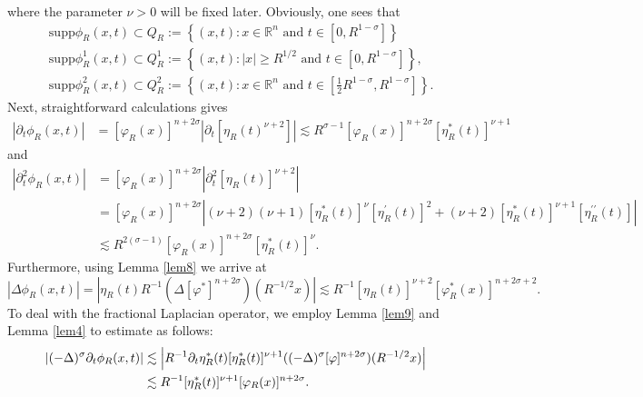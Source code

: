 \documentclass[11pt,reqno]{amsart}
\numberwithin{equation}{section}
\theoremstyle{plain}
\begin{document}
where the parameter $\nu>0$ will be fixed later. Obviously, one sees that
\[
\begin{aligned}
&\text{supp}\phi_R(x,t)\subset Q_R:=\left\{(x,t):x\in \mathbb{R}^n \text{ and } t\in[0,R^{1-\sigma}]\right\} \\
&\text{supp}\phi^1_R(x,t)\subset Q^1_R:=\left\{(x,t):|x|\geq R^{1/2} \text{ and }t\in [0,R^{1-\sigma}]\right\},\\
&\text{supp}\phi^2_R(x,t)\subset Q^2_{R}:=\left\{(x,t):x\in \mathbb{R}^n \text{ and }t\in \left[\frac{1}{2}R^{1-\sigma}, R^{1-\sigma}\right]\right\}.
\end{aligned}
\]
Next, straightforward calculations gives
\begin{equation}\label{eq1sec3.1}
\begin{aligned}
|\partial_t \phi_R(x,t)|&=[\varphi_R(x)]^{n+2\sigma}\left|\partial_t[\eta_R(t)^{\nu+2}]\right|\lesssim R^{\sigma-1}[\varphi_R(x)]^{n+2\sigma}[\eta^*_R(t)]^{\nu+1}
\end{aligned}
\end{equation}
and
\begin{equation}\label{eq2sec3.1}
\begin{aligned}
|\partial^2_t\phi_R(x,t)|&=[\varphi_R(x)]^{n+2\sigma}\left|\partial^2_t[\eta_R(t)]^{\nu+2}\right|\\
&=[\varphi_R(x)]^{n+2\sigma}\left|(\nu+2)(\nu+1)[\eta^*_R(t)]^{\nu}[\eta^{\prime}_R(t)]^2+(\nu+2)[\eta^*_R(t)]^{\nu+1}[\eta^{\prime\prime}_R(t)]\right|\\
&\lesssim R^{2(\sigma-1)}[\varphi_R(x)]^{n+2\sigma}[\eta^*_R(t)]^{\nu}.
\end{aligned}
\end{equation}
Furthermore, using Lemma \ref{lem8} we arrive at
\begin{equation}\label{eq3sec3.1}
|\Delta \phi_R(x,t)|=\left|\eta_R(t)R^{-1}(\Delta [\varphi^*]^{n+2\sigma})(R^{-1/2}x)\right|\lesssim R^{-1}[\eta_R(t)]^{\nu+2}[\varphi_R^*(x)]^{n+2\sigma+2}.
\end{equation}
To deal with the fractional Laplacian operator, we employ Lemma \ref{lem9} and Lemma \ref{lem4} to estimate as follows:
\begin{align}\label{eq4sec3.1}
 |(-\Delta)^{\sigma}\partial_t\phi_R(x,t)| &\lesssim \left|R^{-1}\partial_t\eta^*_R(t)[\eta^*_R(t)]^{\nu+1}((-\Delta)^{\sigma}[\varphi]^{n+2\sigma})(R^{-1/2}x)\right| \notag \\
 &\lesssim R^{-1}[\eta^*_R(t)]^{\nu+1}[\varphi_R(x)]^{n+2\sigma}.   
\end{align}
\end{document}
